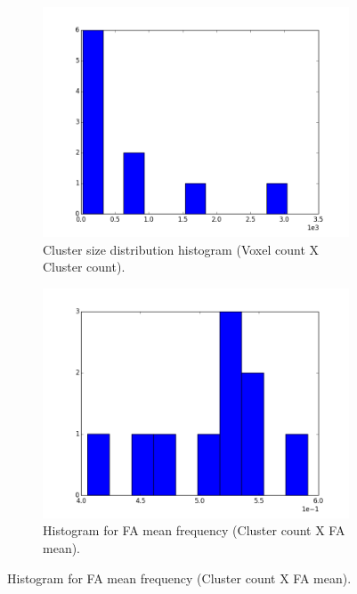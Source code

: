 \documentclass[a4paper,11pt]{report}
\begin{document}
    \begin{figure}[!ht]
      \centering

      \begin{subfigure}[t]{.49\textwidth}
        \includegraphics[width=1\linewidth]{img/histograms/fa_clustered_fa_mask_region_sizes_hist.png}
        \caption{Cluster size distribution histogram (Voxel count X Cluster count).}
        \label{subfig:fa_hist_region}
      \end{subfigure}\hfill%
      \begin{subfigure}[t]{.49\textwidth}
        \includegraphics[width=1\linewidth]{img/histograms/fa_clustered_fa_mask_fa_means_hist.png}
        \caption{Histogram for FA mean frequency (Cluster count X FA mean).}

\end{subfigure}
\end{figure}
\end{document}

